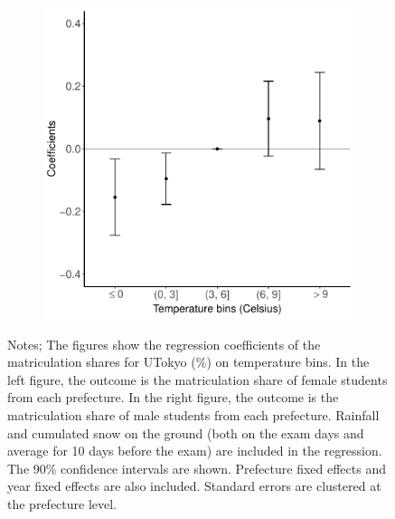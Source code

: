 \documentclass[10pt, pdfmx,hiresbb]{beamer}
\begin{document}
\begin{frame}
\begin{figure}
\begin{minipage}{0.43\textwidth}
\begin{figure}[h]
        \includegraphics[width = \textwidth]{../Output/images/reg_gender_4.pdf}
        \centering
      \end{figure}
    \end{minipage}
    \tiny
    \begin{tablenotes}
    \item Notes;
      The figures show the regression coefficients of the matriculation shares for UTokyo (\%) on temperature bins.
      In the left figure, the outcome is the matriculation share of female students from each prefecture.
      In the right figure, the outcome is the matriculation share of male students from each prefecture.
      Rainfall and cumulated snow on the ground (both on the exam days and average for 10 days before the exam) are included in the regression.
      The 90\% confidence intervals are shown.
      Prefecture fixed effects and year fixed effects are also included.
      Standard errors are clustered at the prefecture level.
    \end{tablenotes}
  \end{figure}
\end{frame}
\end{document}
